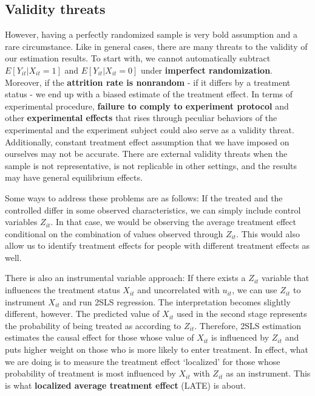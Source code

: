\documentclass[12pt]{article}
\theoremstyle{definition}
\theoremstyle{property}
\theoremstyle{assumption}
\theoremstyle{example}
\theoremstyle{comment}
\begin{document}
\subsection{Validity threats}
However, having a perfectly randomized sample is very bold assumption and a rare circumstance. Like in general cases, there are many threats to the validity of our estimation results. To start with, we cannot automatically subtract $E[Y_{it}|X_{it}=1]$ and $E[Y_{it}|X_{it}=0]$ under \textbf{imperfect randomization}. Moreover, if the \textbf{attrition rate is nonrandom} - if it differs by a treatment status - we end up with a biased estimate of the treatment effect. In terms of experimental procedure, \textbf{failure to comply to experiment protocol} and other \textbf{experimental effects} that rises through peculiar behaviors of the experimental and the experiment subject could also serve as a validity threat. Additionally, constant treatment effect assumption that we have imposed on ourselves may not be accurate. There are external validity threats when the sample is not representative, is not replicable in other settings, and the results may have general equilibrium effects.
\par\medskip
Some ways to address these problems are as follows: If the treated and the controlled differ in some observed characteristics, we can simply include control variables $Z_{it}$.  In that case, we would be observing the average treatment effect conditional on the combination of values observed through $Z_{it}$. This would also allow us to identify treatment effects for people with different treatment effects as well. 
\par\medskip
There is also an instrumental variable approach: If there exists a $Z_{it}$ variable that influences the treatment status $X_{it}$ and uncorrelated with $u_{it}$, we can use $Z_{it}$ to instrument $X_{it}$ and run 2SLS regression. The interpretation becomes slightly different, however. The predicted value of $X_{it}$ used in the second stage represents the probability of being treated as according to $Z_{it}$. Therefore, 2SLS estimation estimates the causal effect for those whose value of $X_{it}$ is influenced by $Z_{it}$ and puts higher weight on those who is more likely to enter treatment. In effect, what we are doing is to measure the treatment effect `localized' for those whose probability of treatment is most influenced by $X_{it}$ with $Z_{it}$ as an instrument. This is what \textbf{localized average treatment effect} (LATE) is about.
\par\medskip
\end{document}
